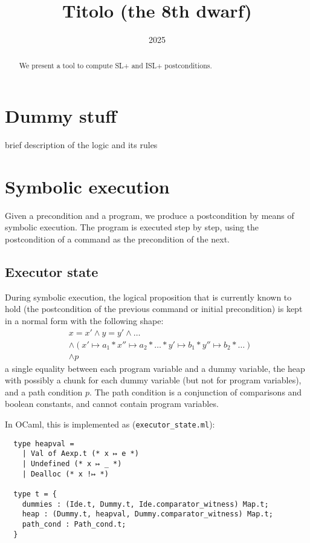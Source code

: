 \documentclass{scrartcl}
\title{Titolo (the 8th dwarf)}
\date{2025}
\begin{document}
\maketitle

\begin{abstract}
  We present a tool to compute SL+ and ISL+ postconditions.
\end{abstract}

\section{Dummy stuff}

brief description of the logic and its rules

\section{Symbolic execution}

Given a precondition and a program, we produce a postcondition by means of symbolic execution. The program is executed step by step, using the postcondition of a command as the precondition of the next.

\subsection{Executor state}

During symbolic execution, the logical proposition that is currently known to hold (\ie the postcondition of the previous command or initial precondition) is kept in a normal form with the following shape:
\begin{align*}
  &x = x' \wedge y = y' \wedge \dots \\
  &\wedge (x' \mapsto a_1 \ast x'' \mapsto a_2 \ast \dots \ast y' \mapsto b_1 \ast y'' \mapsto b_2 \ast \dots) \\
  &\wedge p
\end{align*}
\ie a single equality between each program variable and a dummy variable, the heap with possibly a chunk for each dummy variable (but not for program variables), and a path condition \(p\). The path condition is a conjunction of comparisons and boolean constants, and cannot contain program variables.

In OCaml, this is implemented as (\texttt{executor\_state.ml}):
\begin{verbatim}
  type heapval =
    | Val of Aexp.t (* x ↦ e *)
    | Undefined (* x ↦ _ *)
    | Dealloc (* x !↦ *)

  type t = {
    dummies : (Ide.t, Dummy.t, Ide.comparator_witness) Map.t;
    heap : (Dummy.t, heapval, Dummy.comparator_witness) Map.t;
    path_cond : Path_cond.t;
  }
\end{verbatim}
\end{document}
